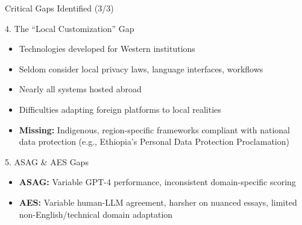 \begin{frame}{Critical Gaps Identified (3/3)}
    \begin{alertblock}{4. The ``Local Customization'' Gap}
        \begin{itemize}
            \item Technologies developed for Western institutions
            \item Seldom consider local privacy laws, language interfaces, workflows
            \item Nearly all systems hosted abroad
            \item Difficulties adapting foreign platforms to local realities
            \item \textbf{Missing:} Indigenous, region-specific frameworks compliant with national data protection (e.g., Ethiopia's Personal Data Protection Proclamation)
        \end{itemize}
    \end{alertblock}
    
    \begin{alertblock}{5. ASAG \& AES Gaps}
        \begin{itemize}
            \item \textbf{ASAG:} Variable GPT-4 performance, inconsistent domain-specific scoring
            \item \textbf{AES:} Variable human-LLM agreement, harsher on nuanced essays, limited non-English/technical domain adaptation
        \end{itemize}
    \end{alertblock}
\end{frame}

